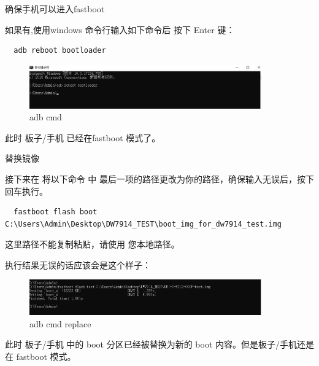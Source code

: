 \begin{frame}[fragile]{确保手机可以进入fastboot}

如果有,使用windows 命令行输入如下命令后 按下 Enter 键：
  \begin{lstlisting}
  adb reboot bootloader
  \end{lstlisting}
  \begin{figure}[htbp]
  \begin{center}
  \includegraphics[width=10cm]{img/rebootbootloader}
  \caption{adb cmd}
  \label{adb cmd}
  \end{center}
  \vspace{-0.5em}
  \end{figure}

此时 板子/手机 已经在fastboot 模式了。

\end{frame}




\begin{frame}[fragile]{替换镜像}

接下来在 将以下命令 中 最后一项的路径更改为你的路径，确保输入无误后，按下回车执行。
  \begin{lstlisting}
  fastboot flash boot C:\Users\Admin\Desktop\DW7914_TEST\boot_img_for_dw7914_test.img
  \end{lstlisting}
这里路径不能复制粘贴，请使用 您本地路径。

执行结果无误的话应该会是这个样子：
  \begin{figure}[htbp]
  \begin{center}
  \includegraphics[width=10cm]{img/replace}
  \caption{adb cmd replace}
  \label{adb cmd replace}
  \end{center}
  \vspace{-0.5em}
  \end{figure}

此时 板子/手机 中的 boot 分区已经被替换为新的 boot 内容。但是板子/手机还是在 fastboot 模式。

\end{frame}



